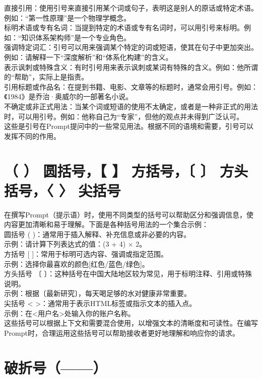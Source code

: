 \documentclass[12pt]{book}
\begin{document}
直接引用：使用引号来直接引用某个词或句子，表明这是别人的原话或特定术语。例如：“第一性原理”是一个物理学概念。\\
标明术语或专有名词：当提到特定的术语或专有名词时，可以用引号来标明。例如：“知识体系架构师”是一个专业角色。\\
强调特定词汇：引号可以用来强调某个特定的词或短语，使其在句子中更加突出。例如：请解释一下“深度解析”和“体系化构建”的含义。\\
表示讽刺或特殊含义：有时引号用来表示讽刺或某词有特殊的含义。例如：他所谓的“帮助”，实际上是指责。\\
引用标题或作品名：在提到书籍、电影、文章等的标题时，通常会用引号。例如：《1984》是乔治·奥威尔的一部著名小说。\\
不确定或非正式用法：当某个词或短语的使用不太确定，或者是一种非正式的用法时，可以用引号。例如：他称自己为“专家”，但他的观点并未得到广泛认可。\\
这些是引号在Prompt提问中的一些常见用法。根据不同的语境和需要，引号可以发挥不同的作用。\\

\section{（ ） 圆括号，【 】 方括号，〔 〕 方头括号，〈 〉 尖括号}

在撰写Prompt（提示语）时，使用不同类型的括号可以帮助区分和强调信息，使内容更加清晰和易于理解。下面是各种括号用法的一个集合示例：\\

圆括号 ( )：通常用于插入解释、补充信息或非必要的内容。\\
示例：请计算下列表达式的值：(3 + 4) × 2。\\
方括号 [ ]：常用于标明可选内容、强调或指定范围。\\
示例：选择你最喜欢的颜色[红色/蓝色/绿色]。\\
方头括号 〔 〕：这种括号在中国大陆地区较为常见，用于标明注释、引用或特殊说明。\\
示例：根据〔最新研究〕，每天喝足够的水对健康非常重要。\\
尖括号 < >：通常用于表示HTML标签或指示文本的插入点。\\
示例：在<用户名>处输入你的账户名称。\\
这些括号可以根据上下文和需要混合使用，以增强文本的清晰度和可读性。在编写Prompt时，合理运用这些括号可以帮助接收者更好地理解和响应你的请求。\\

\section{破折号（——）}
\end{document}
